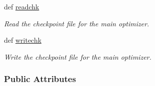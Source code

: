 \begin{DoxyCompactItemize}
def \hyperlink{classforcebalance_1_1optimizer_1_1Optimizer_a05ee5fe985b3e2ec71071ca061e42d66}{readchk}
\begin{DoxyCompactList}\small\item\em Read the checkpoint file for the main optimizer. \end{DoxyCompactList}\item 
def \hyperlink{classforcebalance_1_1optimizer_1_1Optimizer_aa7ac7cda43b70ac58ccbd6c8445e88ef}{writechk}
\begin{DoxyCompactList}\small\item\em Write the checkpoint file for the main optimizer. \end{DoxyCompactList}\end{DoxyCompactItemize}
\subsubsection*{Public Attributes}
